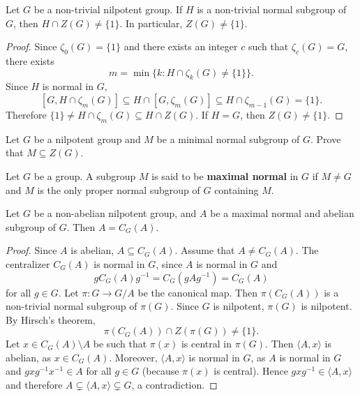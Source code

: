 \begin{theorem}[Hirsch]
\label{thm:Hirsch}
Let $G$ be a non-trivial nilpotent group. If $H$ is a non-trivial normal subgroup of $G$, 
then $H\cap Z(G)\ne\{1\}$. In particular, $Z(G)\ne\{1\}$. 
\end{theorem}

\begin{proof}
Since $\zeta_0(G)=\{1\}$ and there exists an integer $c$ such that $\zeta_c(G)=G$, 
there exists 
\[
m=\min\{k:H\cap\zeta_k(G)\ne\{1\}\}.
\]
Since $H$ is normal in $G$, 
\[
[G,H\cap\zeta_m(G)]\subseteq H\cap[G,\zeta_m(G)]\subseteq H\cap\zeta_{m-1}(G)=\{1\}.
\]
Therefore $\{1\}\ne H\cap\zeta_m(G)\subseteq H\cap Z(G)$. If $H=G$, then $Z(G)\ne\{1\}$. 
\end{proof}

\begin{exercise}
\label{xca:nilpotent_minimalnormal}
Let $G$ be a nilpotent group and $M$ be a minimal normal subgroup of $G$. Prove 
that $M\subseteq Z(G)$.
\end{exercise}


\begin{definition}
    Let $G$ be a group. A subgroup $M$ is said to be \textbf{maximal normal} in $G$
    if $M\ne G$ and $M$ is the only proper normal subgroup of $G$ containing $M$. 
\end{definition}

\begin{corollary}
Let $G$ be a non-abelian nilpotent group, and $A$ be a maximal normal and abelian 
subgroup of $G$. Then $A=C_G(A)$.
\end{corollary}

\begin{proof}
Since $A$ is abelian, $A\subseteq C_G(A)$. Assume that $A\ne C_G(A)$.
The centralizer $C_G(A)$ is normal in $G$, since $A$ is normal in $G$ and  
\[
gC_G(A)g^{-1}=C_G(gAg^{-1})=C_G(A)
\]
for all $g\in G$. Let $\pi\colon G\to G/A$ be the canonical map. 
Then $\pi(C_G(A))$ is a non-trivial normal subgroup of $\pi(G)$. Since 
$G$ is nilpotent, $\pi(G)$ is nilpotent. By Hirsch's theorem, 
\[
\pi(C_G(A))\cap Z(\pi(G))\ne\{1\}.
\]
Let $x\in C_G(A)\setminus A$ be such that $\pi(x)$ is central in $\pi(G)$.  Then 
$\langle A,x\rangle$ is abelian, as $x\in C_G(A)$. Moreover,  $\langle
A,x\rangle$ is normal in $G$, as $A$ is normal in $G$ and 
$gxg^{-1}x^{-1}\in A$ for all  $g\in G$ (because $\pi(x)$ is central). Hence
	$gxg^{-1}\in \langle A,x\rangle$ and therefore $A\subsetneq \langle
	A,x\rangle\subsetneq G$, a contradiction.
\end{proof}

